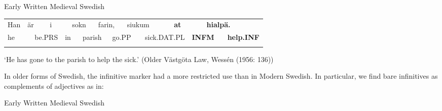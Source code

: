 \begin{listWWNumileveli}
\item 

\begin{styleExample}
Early Written Medieval Swedish

\end{styleExample}

\end{listWWNumileveli}

\begin{tabular}{llllllllllllllll}
\lsptoprule
Han & \multicolumn{2}{l}{är

} & \multicolumn{2}{l}{i

} & \multicolumn{2}{l}{sokn

} & \multicolumn{2}{l}{farin,

} & \multicolumn{2}{l}{siukum

} & \multicolumn{2}{l}{{\bfseries at}

} & \multicolumn{2}{l}{{\bfseries hialpä.}

} & \\
\multicolumn{2}{l}{he

} & \multicolumn{2}{l}{be.PRS

} & \multicolumn{2}{l}{in

} & \multicolumn{2}{l}{parish

} & \multicolumn{2}{l}{go.PP

} & \multicolumn{2}{l}{sick.DAT.PL

} & \multicolumn{2}{l}{{\bfseries INFM}

} & \multicolumn{2}{l}{{\bfseries help.INF}

}\\
\lspbottomrule
\end{tabular}

\begin{styleTranslation}
‘He has gone to the parish to help the sick.’ (Older Västgöta Law, Wessén (1956: 136)) 

\end{styleTranslation}

\begin{styleBodyTextFirst}
In older forms of Swedish, the infinitive marker had a more restricted use than in Modern Swedish. In particular, we find bare infinitives as complements of adjectives as in:

\end{styleBodyTextFirst}

\begin{listWWNumileveli}
\item 

\begin{styleExample}
Early Written Medieval Swedish

\end{styleExample}

\end{listWWNumileveli}

